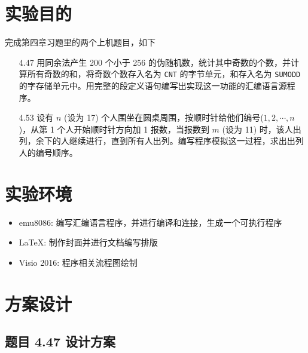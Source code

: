 \documentclass[12pt,AutoFakeBold]{article}
\begin{document}
\maketitle
\setcounter{tocdepth}{2}
\tableofcontents  %


\makeatletter
\begin{center}
    \LARGE \textbf{\textsf{\@problem}}
\end{center}
\makeatother





\section{实验目的}

完成第四章习题里的两个上机题目，如下

\begin{itemize}
	\item [4.47] 用同余法产生 200 个小于 256 的伪随机数，统计其中奇数的个数，并计算所有奇数的和，将奇数个数存入名为 \lstinline|CNT| 的字节单元，和存入名为 \lstinline|SUMODD| 的字存储单元中。用完整的段定义语句编写出实现这一功能的汇编语言源程序。
	\item [4.53] 设有 $n$ (设为 17) 个人围坐在圆桌周围，按顺时针给他们编号($1,2,\cdots,n$)，从第 1 个人开始顺时针方向加 1 报数，当报数到 $m$ (设为 11) 时，该人出列，余下的人继续进行，直到所有人出列。编写程序模拟这一过程，求出出列人的编号顺序。
\end{itemize}


\section{实验环境}

\begin{itemize}
	\item emu8086: 编写汇编语言程序，并进行编译和连接，生成一个可执行程序
	\item \LaTeX: 制作封面并进行文档编写排版
	\item Visio 2016: 程序相关流程图绘制
\end{itemize}

\section{方案设计}

\subsection{题目 4.47 设计方案}
\end{document}
